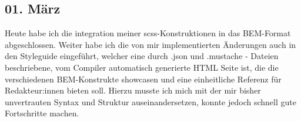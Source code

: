 \subsection{01. März}
Heute habe ich die integration meiner scss-Konstruktionen in das BEM-Format abgeschlossen. Weiter habe ich die von mir implementierten Änderungen auch in den Styleguide eingeführt, welcher eine durch .json und .mustache - Dateien beschriebene, vom Compiler automatisch generierte HTML Seite ist, die die verschiedenen BEM-Konstrukte showcasen und eine einheitliche Referenz für Redakteur:innen bieten soll. Hierzu musste ich mich mit der mir bisher unvertrauten Syntax und Struktur auseinandersetzen, konnte jedoch schnell gute Fortschritte machen.